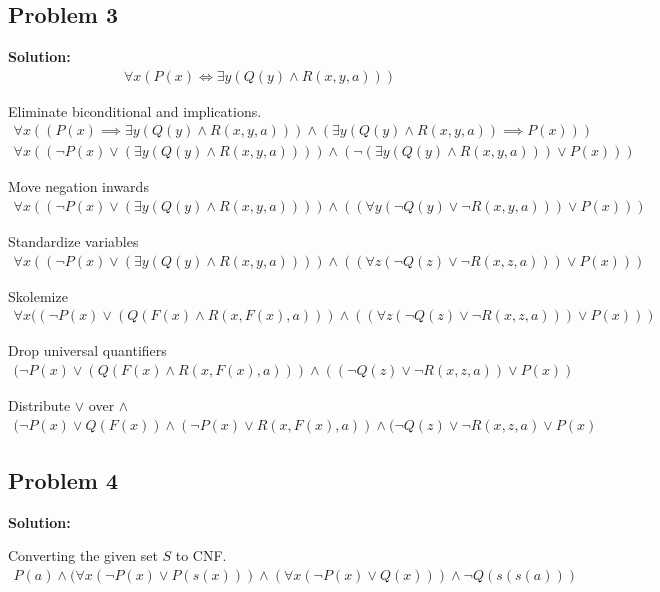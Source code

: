 \documentclass[12pt,a4paper]{article}
\newcommand{\solution}{\noindent\textbf{Solution:}\\\indent}
\begin{document}
\newpage
\subsection*{Problem 3}
\solution
\begin{align*}
    \forall x(P(x) \iff \exists y(Q(y) \land R(x,y,a)))
\end{align*}

Eliminate biconditional and implications.
\begin{align*}
    \forall x((P(x) \implies \exists y(Q(y) \land R(x,y,a))) \land (\exists y(Q(y) \land R(x,y,a)) \implies P(x))) \\
    \forall x((\neg P(x) \lor (\exists y(Q(y) \land R(x,y,a)))) \land (\neg(\exists y(Q(y) \land R(x,y,a))) \lor P(x)))
\end{align*}

Move negation inwards
\begin{align*}
    \forall x((\neg P(x) \lor (\exists y(Q(y) \land R(x,y,a)))) \land ((\forall y (\neg Q(y) \lor \neg R(x,y,a))) \lor P(x)))
\end{align*}

Standardize variables
\begin{align*}
    \forall x((\neg P(x) \lor (\exists y(Q(y) \land R(x,y,a)))) \land ((\forall z (\neg Q(z) \lor \neg R(x,z,a))) \lor P(x)))
\end{align*}

Skolemize
\begin{align*}
    \forall x((\neg P(x) \lor (Q(F(x) \land R(x,F(x),a))) \land ((\forall z (\neg Q(z) \lor \neg R(x,z,a))) \lor P(x)))
\end{align*}

Drop universal quantifiers
\begin{align*}
    (\neg P(x) \lor (Q(F(x) \land R(x,F(x),a))) \land ((\neg Q(z) \lor \neg R(x,z,a)) \lor P(x))
\end{align*}

Distribute $\lor$ over $\land$
\begin{align*}
    (\neg P(x) \lor Q(F(x)) \land (\neg P(x) \lor R(x,F(x),a)) \land (\neg Q(z) \lor \neg R(x,z,a) \lor P(x)
\end{align*}

\newpage
\subsection*{Problem 4}
\solution

Converting the given set $S$ to CNF.
\begin{align*}
    P(a) \land (\forall x(\neg P(x) \lor P(s(x))) \land (\forall x(\neg P(x) \lor Q(x))) \land \neg Q(s(s(a)))
\end{align*}
\end{document}
